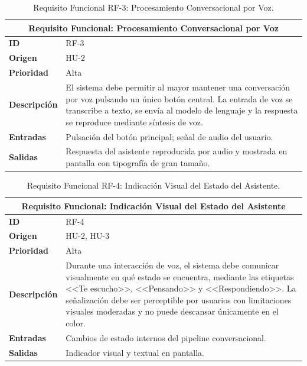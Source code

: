 \begin{table}[htbp]
    \centering
    \caption{Requisito Funcional RF-3: Procesamiento Conversacional por Voz.}
    \label{tab:rf3}
    \renewcommand{\arraystretch}{1.3}
    \begin{tabular}{|l|>{\raggedright\arraybackslash}p{}|}
        \hline
        \multicolumn{2}{|c|}{\textbf{Requisito Funcional: Procesamiento Conversacional por Voz}} \\
        \hline
        \textbf{ID} & RF-3 \\
        \hline
        \textbf{Origen} & HU-2 \\
        \hline
        \textbf{Prioridad} & Alta \\
        \hline
        \textbf{Descripción} & El sistema debe permitir al mayor mantener una conversación por voz pulsando un único botón central. La entrada de voz se transcribe a texto, se envía al modelo de lenguaje y la respuesta se reproduce mediante síntesis de voz. \\
        \hline
        \textbf{Entradas} & Pulsación del botón principal; señal de audio del usuario. \\
        \hline
        \textbf{Salidas} & Respuesta del asistente reproducida por audio y mostrada en pantalla con tipografía de gran tamaño. \\
        \hline
    \end{tabular}

\end{table}

\begin{table}[htbp]
    \centering
    \caption{Requisito Funcional RF-4: Indicación Visual del Estado del Asistente.}
    \label{tab:rf4}
    \renewcommand{\arraystretch}{1.3}
    \begin{tabular}{|l|>{\raggedright\arraybackslash}p{}|}
        \hline
        \multicolumn{2}{|c|}{\textbf{Requisito Funcional: Indicación Visual del Estado del Asistente}} \\
        \hline
        \textbf{ID} & RF-4 \\
        \hline
        \textbf{Origen} & HU-2, HU-3 \\
        \hline
        \textbf{Prioridad} & Alta \\
        \hline
        \textbf{Descripción} & Durante una interacción de voz, el sistema debe comunicar visualmente en qué estado se encuentra, mediante las etiquetas <<Te escucho>>, <<Pensando>> y <<Respondiendo>>. La señalización debe ser perceptible por usuarios con limitaciones visuales moderadas y no puede descansar únicamente en el color. \\
        \hline
        \textbf{Entradas} & Cambios de estado internos del pipeline conversacional. \\
        \hline
        \textbf{Salidas} & Indicador visual y textual en pantalla. \\
        \hline
    \end{tabular}

\end{table}

